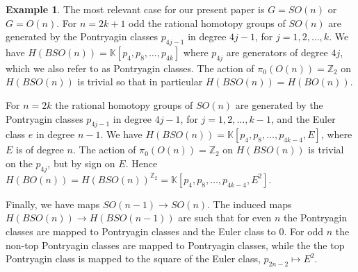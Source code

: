 \documentclass[a4paper]{amsart}
\theoremstyle{plain}
\theoremstyle{definition}
\newtheorem{ex}[thm]{Example}
\newcommand{\Z}{{\mathbb{Z}}}
\newcommand{\K}{{\mathbb{K}}}
\newcommand{\SO}{\mathit{SO}}
\begin{document}
\begin{ex}
The most relevant case for our present paper is $G=\SO(n)$ or $G=O(n)$.
For $n=2k+1$ odd the rational homotopy groups of $\SO(n)$ are generated by the Pontryagin classes $p_{4j-1}$ in degree $4j-1$, for $j=1,2,\dots, k$. We have $H(BSO(n))=\K[p_{4},p_8,\dots, p_{4k}]$ where $p_{4j}$ are generators of degree $4j$, which we also refer to as Pontryagin classes.
The action of $\pi_0(O(n))=\Z_2$ on $H(B\SO(n))$ is trivial so that in particular $H(B\SO(n))=H(BO(n))$.

For $n=2k$ the rational homotopy groups of $\SO(n)$ are generated by the Pontryagin classes $p_{4j-1}$ in degree $4j-1$, for $j=1,2,\dots, k-1$, and the Euler class $e$ in degree $n-1$. We have $H(B\SO(n))=\K[p_{4},p_8,\dots, p_{4k-4}, E]$, where $E$ is of degree $n$.
The action of $\pi_0(O(n))=\Z_2$ on $H(B\SO(n))$ is trivial on the $p_{4j}$, but by sign on $E$. Hence $H(BO(n))=H(B\SO(n))^{\Z_2}=\K[p_{4},p_8,\dots, p_{4k-4}, E^2]$.

Finally, we have maps $\SO(n-1)\to \SO(n)$. The induced maps $H(B\SO(n))\to H(B\SO(n-1))$ are such that for even $n$ the Pontryagin classes are mapped to Pontryagin classes and the Euler class to 0. 
For odd $n$ the non-top Pontryagin classes are mapped to Pontryagin classes, while the the top Pontryagin class is mapped to the square of the Euler class, $p_{2n-2}\mapsto E^2$.
\end{ex}
\end{document}
